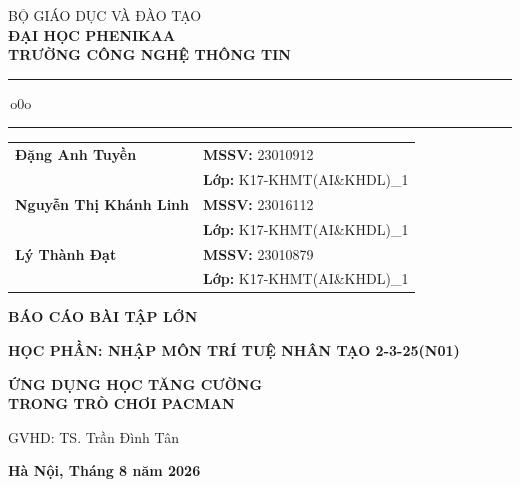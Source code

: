 \documentclass[12pt,a4paper]{article}
\theoremstyle{plain} %
\theoremstyle{plain} %
\theoremstyle{plain} %
\theoremstyle{nonumberplain}  %
\numberwithin{equation}{section}
\numberwithin{figure}{section}
\numberwithin{table}{section}
\begin{document}
\begin{titlepage}
\thispagestyle{empty}
\thisfancypage{\setlength{\fboxsep}{0.2cm}\setlength{\fboxrule}{1pt}\doublebox}{}
\begin{center}
	\large
	BỘ GIÁO DỤC VÀ ĐÀO TẠO\\
	\textbf{ĐẠI HỌC PHENIKAA}\\
	\textbf{TRƯỜNG CÔNG NGHỆ THÔNG TIN}\\[0.15cm]
	\rule{4cm}{0.4pt}\,o0o\,\rule{4cm}{0.4pt}
\end{center}
\vspace{1.5cm}
\begin{center}
	\normalsize
	\renewcommand{\arraystretch}{1.15}
	\begin{tabular}{@{}p{5.2cm}l@{}}
        \textbf{Đặng Anh Tuyền} & \textbf{MSSV:} 23010912 \\
                                & \textbf{Lớp:} K17-KHMT(AI\&KHDL)\_1 \\[0.25cm]
        \textbf{Nguyễn Thị Khánh Linh} & \textbf{MSSV:} 23016112 \\
                                        & \textbf{Lớp:} K17-KHMT(AI\&KHDL)\_1 \\[0.25cm]
        \textbf{Lý Thành Đạt} & \textbf{MSSV:} 23010879 \\
                               & \textbf{Lớp:} K17-KHMT(AI\&KHDL)\_1
	\end{tabular}
\end{center}
\vspace{1.3cm}
\begin{center}
    \bf\Large {BÁO CÁO BÀI TẬP LỚN}
\end{center}
\begin{center}
    \bf\large {HỌC PHẦN: NHẬP MÔN TRÍ TUỆ NHÂN TẠO 2-3-25(N01)}
\end{center}
\vspace{0.65cm}
\begin{center}
	\bf\Large ỨNG DỤNG HỌC TĂNG CƯỜNG\\
    TRONG TRÒ CHƠI PACMAN
\end{center}
\vfill
\begin{center}
    GVHD: TS. Trần Đình Tân
\end{center}
\vfill
\begin{center}
    {\large\textbf{Hà Nội, Tháng 8 năm 2026}}
\end{center}
\vspace{0.25cm}
\end{titlepage}
\end{document}
